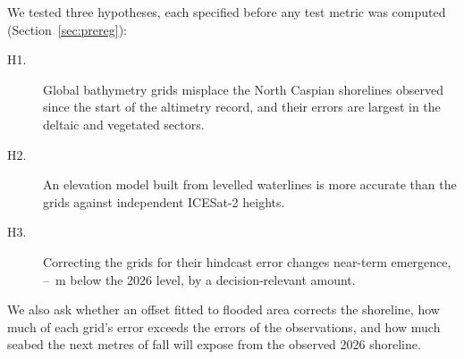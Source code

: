We tested three hypotheses, each specified before any test metric was computed (Section~\ref{sec:prereg}):
\begin{description}
  \item[H1.] Global bathymetry grids misplace the North Caspian shorelines observed since the start of the altimetry record, and their errors are largest in the deltaic and vegetated sectors.
  \item[H2.] An elevation model built from levelled waterlines is more accurate than the grids against independent ICESat-2 heights.
  \item[H3.] Correcting the grids for their hindcast error changes near-term emergence, --~m below the 2026 level, by a decision-relevant amount.
\end{description}
We also ask whether an offset fitted to flooded area corrects the shoreline, how much of each grid's error exceeds the errors of the observations, and how much seabed the next metres of fall will expose from the observed 2026 shoreline.
